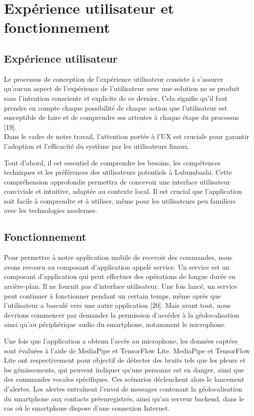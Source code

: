 \section{Expérience utilisateur et fonctionnement}
\subsection{Expérience utilisateur}
Le processus de conception de l'expérience utilisateur consiste à s'assurer qu'aucun aspect de l'expérience de l'utilisateur avec une solution ne se produit sans l’intention consciente et explicite de ce dernier. Cela signifie qu'il faut prendre en compte chaque possibilité de chaque action que l'utilisateur est susceptible de faire et de comprendre ses attentes à chaque étape du processus [19].\\

Dans le cadre de notre travail, l'attention portée à l'UX est cruciale pour garantir l'adoption et l'efficacité du système par les utilisateurs finaux.

Tout d'abord, il est essentiel de comprendre les besoins, les compétences techniques et les préférences des utilisateurs potentiels à Lubumbashi. Cette compréhension approfondie permettra de concevoir une interface utilisateur conviviale et intuitive, adaptée au contexte local. Il est crucial que l'application soit facile à comprendre et à utiliser, même pour les utilisateurs peu familiers avec les technologies modernes.

\subsection{Fonctionnement}

Pour permettre à notre application mobile de recevoir des commandes, nous avons recouru au composant d’application appelé service. Un service est un composant d'application qui peut effectuer des opérations de longue durée en arrière-plan. Il ne fournit pas d'interface utilisateur. Une fois lancé, un service peut continuer à fonctionner pendant un certain temps, même après que l'utilisateur a basculé vers une autre application [20]. Mais avant tout, nous devrions commencer par demander la permission d'accéder à la géolocalisation ainsi qu'au périphérique audio du smartphone, notamment le microphone.

Une fois que l'application a obtenu l'accès au microphone, les données captées sont évaluées à l'aide de MediaPipe et TensorFlow Lite. MediaPipe et TensorFlow Lite ont respectivement pour objectif de détecter des bruits tels que les pleurs et les gémissements, qui peuvent indiquer qu'une personne est en danger, ainsi que des commandes vocales spécifiques. Ces scénarios déclenchent alors le lancement d'alertes. Les alertes entraînent l'envoi de messages contenant la géolocalisation du smartphone aux contacts préenregistrés, ainsi qu'au serveur backend, dans le cas où le smartphone dispose d'une connexion Internet.

